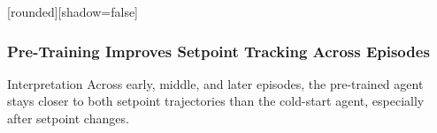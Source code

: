 \documentclass[aspectratio=169]{beamer}
\begin{document}
\begin{frame}
[rounded][shadow=false]
\frametitle{\large \textbf{Pre-Training Improves Setpoint Tracking Across Episodes}}
\scriptsize

\vspace{-0.26cm}
\begin{center}
\resizebox{0.985\textwidth}{!}{\EpisodeTrackingSnapshotsFigure}
\end{center}

\vspace{-0.24cm}
\begin{block}{Interpretation}
\justifying
Across early, middle, and later episodes, the pre-trained agent stays closer to both setpoint trajectories than the cold-start agent, especially after setpoint changes.
\end{block}

\end{frame}
\end{document}
